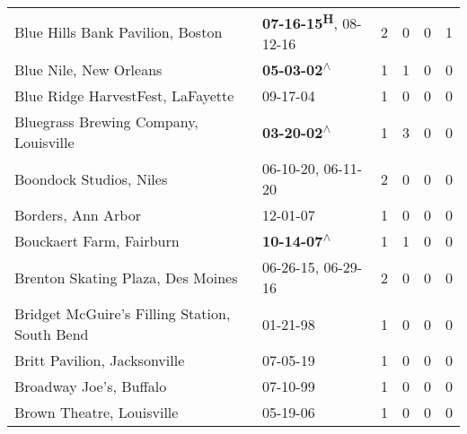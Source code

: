 \begin{supertabular}{p{0.4\textwidth}p{0.3\textwidth}p{0.05\textwidth}p{0.05\textwidth}p{0.05\textwidth}p{0.05\textwidth}}
                                             Blue Hills Bank Pavilion, Boston &                            \textbf{07-16-15\textsuperscript{H}}, 08-12-16\textsuperscript{} &  2 &  0 &  0 &  1 \\
                                                       Blue Nile, New Orleans &                                                 \textbf{05-03-02\textsuperscript{$\wedge$}} &  1 &  1 &  0 &  0 \\
                                            Blue Ridge HarvestFest, LaFayette &                                                                  09-17-04\textsuperscript{} &  1 &  0 &  0 &  0 \\
                                        Bluegrass Brewing Company, Louisville &                                                 \textbf{03-20-02\textsuperscript{$\wedge$}} &  1 &  3 &  0 &  0 \\
                                                      Boondock Studios, Niles &                                      06-10-20\textsuperscript{}, 06-11-20\textsuperscript{} &  2 &  0 &  0 &  0 \\
                                                           Borders, Ann Arbor &                                                                  12-01-07\textsuperscript{} &  1 &  0 &  0 &  0 \\
                                                     Bouckaert Farm, Fairburn &                                                 \textbf{10-14-07\textsuperscript{$\wedge$}} &  1 &  1 &  0 &  0 \\
                                            Brenton Skating Plaza, Des Moines &                                      06-26-15\textsuperscript{}, 06-29-16\textsuperscript{} &  2 &  0 &  0 &  0 \\
                                Bridget McGuire's Filling Station, South Bend &                                                                  01-21-98\textsuperscript{} &  1 &  0 &  0 &  0 \\
                                                 Britt Pavilion, Jacksonville &                                                                  07-05-19\textsuperscript{} &  1 &  0 &  0 &  0 \\
                                                      Broadway Joe's, Buffalo &                                                                  07-10-99\textsuperscript{} &  1 &  0 &  0 &  0 \\
                                                    Brown Theatre, Louisville &                                                                  05-19-06\textsuperscript{} &  1 &  0 &  0 &  0 \\

\end{supertabular}
